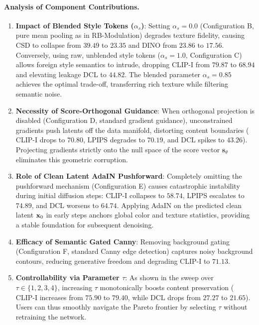 \paragraph{Analysis of Component Contributions.}
\begin{enumerate}
    \item \textbf{Impact of Blended Style Tokens ($\alpha_s$)}: Setting $\alpha_s = 0.0$ (Configuration B, pure mean pooling as in RB-Modulation) degrades texture fidelity, causing CSD to collapse from $39.49$ to $23.35$ and DINO from $23.86$ to $17.56$. Conversely, using raw, unblended style tokens ($\alpha_s = 1.0$, Configuration C) allows foreign style semantics to intrude, dropping CLIP-I from $79.87$ to $68.94$ and elevating leakage DCL to $44.82$. The blended parameter $\alpha_s = 0.85$ achieves the optimal trade-off, transferring rich texture while filtering semantic noise.
    \item \textbf{Necessity of Score-Orthogonal Guidance}: When orthogonal projection is disabled (Configuration D, standard gradient guidance), unconstrained gradients push latents off the data manifold, distorting content boundaries ($\text{CLIP-I}$ drops to $70.80$, $\text{LPIPS}$ degrades to $70.19$, and $\text{DCL}$ spikes to $43.26$). Projecting gradients strictly onto the null space of the score vector $\mathbf{s}_\theta$ eliminates this geometric corruption.
    \item \textbf{Role of Clean Latent AdaIN Pushforward}: Completely omitting the pushforward mechanism (Configuration E) causes catastrophic instability during initial diffusion steps: CLIP-I collapses to $58.74$, LPIPS escalates to $74.89$, and DCL worsens to $64.74$. Applying AdaIN on the predicted clean latent $\mathbf{x}_0$ in early steps anchors global color and texture statistics, providing a stable foundation for subsequent denoising.
    \item \textbf{Efficacy of Semantic Gated Canny}: Removing background gating (Configuration F, standard Canny edge detection) captures noisy background contours, reducing generative freedom and degrading CLIP-I to $71.13$.
    \item \textbf{Controllability via Parameter $\tau$}: As shown in the sweep over $\tau \in \{1, 2, 3, 4\}$, increasing $\tau$ monotonically boosts content preservation ($\text{CLIP-I}$ increases from $75.90$ to $79.40$, while $\text{DCL}$ drops from $27.27$ to $21.65$). Users can thus smoothly navigate the Pareto frontier by selecting $\tau$ without retraining the network.
\end{enumerate}

